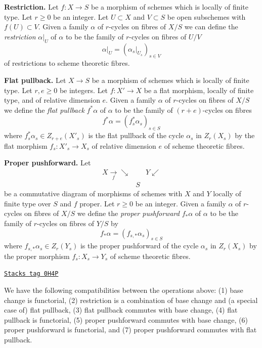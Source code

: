 \medskip\noindent
{\bf Restriction.} Let $f : X \to S$ be a morphism of schemes which is locally
of finite type. Let $r \geq 0$ be an integer. Let $U \subset X$ and
$V \subset S$ be open subschemes with $f(U) \subset V$. Given a family
$\alpha$ of $r$-cycles on fibres of $X/S$ we can define the
{\it restriction} $\alpha|_U$ of $\alpha$ to be the
family of $r$-cycles on fibres of $U/V$
$$
\alpha|_U = (\alpha_s|_{U_s})_{s \in V}
$$
of restrictions to scheme theoretic fibres.

\medskip\noindent
{\bf Flat pullback.} Let $X \to S$ be a morphism of schemes which is locally
of finite type. Let $r, e \geq 0$ be integers. Let $f : X' \to X$ be a
flat morphism, locally of finite type, and of relative dimension $e$.
Given a family $\alpha$ of $r$-cycles
on fibres of $X/S$ we define the {\it flat pullback} $f^*\alpha$ of $\alpha$
to be the family of $(r + e)$-cycles on fibres
$$
f^*\alpha = (f_s^*\alpha_s)_{s \in S}
$$
where $f_s^*\alpha_s \in Z_{r + e}(X'_s)$ is the flat pullback
of the cycle $\alpha_s$ in $Z_r(X_s)$ by the flat morphism
$f_s : X'_s \to X_s$ of relative dimension $e$
of scheme theoretic fibres.

\medskip\noindent
{\bf Proper pushforward.} Let
$$
\begin{array}{ccc}X \underset{f}{\longrightarrow}\searrow &  & Y \swarrow \\  & S & \end{array}
$$
be a commutative diagram of morphisms of schemes with $X$ and $Y$
locally of finite type over $S$ and $f$ proper. Let $r \geq 0$ be an integer.
Given a family $\alpha$ of $r$-cycles on fibres of $X/S$ we define the
{\it proper pushforward} $f_*\alpha$ of $\alpha$ to be the family of
$r$-cycles on fibres of $Y/S$ by
$$
f_*\alpha = (f_{s, *}\alpha_s)_{s \in S}
$$
where $f_{s, *}\alpha_s \in Z_r(Y_s)$ is the proper pushforward
of the cycle $\alpha_s$ in $Z_r(X_s)$ by the proper morphism
$f_s : X_s \to Y_s$ of scheme theoretic fibres.

\begin{lemma}[Compatibilities]
\label{relative-cycles-lemma-compatibilities}
\href{https://stacks.math.columbia.edu/tag/0H4P}{\texttt{Stacks tag 0H4P}}

We have the following compatibilities between the operations above:
(1) base change is functorial,
(2) restriction is a combination of base change and (a special case of)
flat pullback,
(3) flat pullback commutes with base change,
(4) flat pullback is functorial,
(5) proper pushforward commutes with base change,
(6) proper pushforward is functorial, and
(7) proper pushforward commutes with flat pullback.
\end{lemma}

